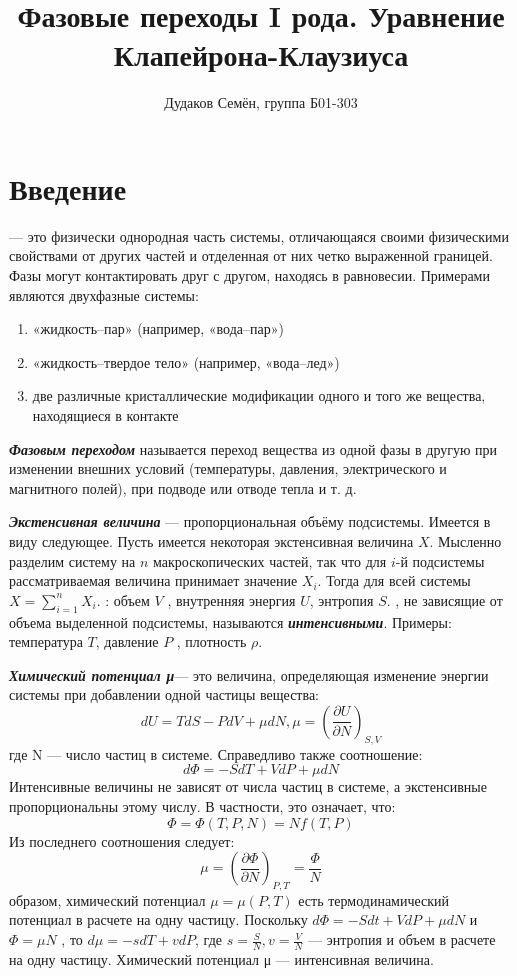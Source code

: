 \documentclass[a4, 12pt]{article}
\title{Фазовые переходы I рода. Уравнение Клапейрона-Клаузиуса}
\author{Дудаков Семён, группа Б01-303}
\date{}
\begin{document}
	\maketitle
\section{Введение}
{\itshape\textbf{\space\space{}}} — это физически однородная
часть системы, отличающаяся своими физическими свойствами от
других частей и отделенная от них четко выраженной границей.
Фазы могут контактировать друг с другом, находясь в равновесии.
Примерами являются двухфазные системы:
\begin{enumerate}
    \item «жидкость–пар» (например, «вода–пар»)
    \item «жидкость–твердое тело» (например, «вода–лед»)
    \item две различные кристаллические модификации одного и того же
вещества, находящиеся в контакте
\end{enumerate}
\par
{\itshape\textbf{Фазовым переходом}} называется переход вещества из одной фазы
в другую при изменении внешних условий (температуры, давления,
электрического и магнитного полей), при подводе или отводе тепла
и т. д.
\par
{\itshape\textbf{Экстенсивная величина}} — пропорциональная объёму подсистемы.
Имеется в виду следующее. Пусть имеется некоторая экстенсивная
величина $X$. Мысленно разделим систему на $n$ макроскопических
частей, так что для $i$-й подсистемы рассматриваемая величина принимает значение $X_i$. Тогда для всей системы $X=\sum_{i=1}^{n} X_i$. 
: объем $V$ , внутренняя энергия $U$, энтропия $S$.
, не зависящие от объема выделенной подсистемы, называются {\itshape\textbf{интенсивными}}. Примеры: температура $T$, давление $P$ , плотность $\rho$.
\par
{\itshape\textbf{Химический потенциал μ}}— это
величина, определяющая изменение энергии системы при добавлении одной частицы вещества:
\begin{equation}
    dU = TdS - P dV + \mu dN, \mu = \left(\frac{\partial U}{\partial N}\right)_{S,V}
\end{equation}
где N — число частиц в системе. Справедливо также соотношение:
\begin{equation}
    d\Phi = - SdT + VdP + \mu dN
\end{equation}
Интенсивные величины не зависят от числа частиц в системе, а
экстенсивные пропорциональны этому числу. В частности, это означает, что:
\begin{equation}
    \Phi = \Phi(T, P, N) = Nf(T, P)
\end{equation}
Из последнего соотношения следует:
\begin{equation}
    \mu = \left(\frac{\partial\Phi}{\partial N} \right)_{P, T}=\frac{\Phi}{N}
\end{equation}
 образом, химический потенциал $\mu = \mu(P, T)$ есть термодинамический потенциал в расчете на одну частицу. Поскольку $d\Phi = -Sdt + VdP + \mu dN$ и $\Phi = \mu N$ , то
$d\mu = -sdT+vdP$,
где $s =\frac{S}{N}, v = \frac{V}{N}$ — энтропия и объем в расчете на одну частицу. Химический потенциал μ — интенсивная величина.
\end{document}
